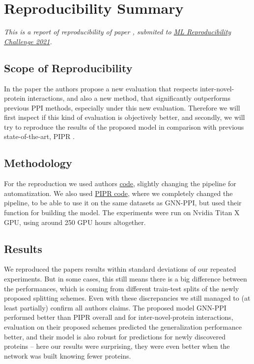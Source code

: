

\section{Reproducibility Summary}

\textit{This is a report of reproducibility of paper \cite{lv2021learning}, submited to  \href{https://paperswithcode.com/rc2021}{ML Reproducibility Challenge 2021}.}

\subsection*{Scope of Reproducibility}

In the paper the authors
propose a new evaluation that respects inter-novel-protein interactions, and also a new method, that significantly outperforms previous PPI methods, especially under this new evaluation. Therefore we will first inspect if this kind of evaluation is objectively better, 
and secondly, we will try to reproduce the results of the proposed model in comparison with previous state-of-the-art, PIPR \cite{chen2019pipr}.

\subsection*{Methodology}

For the reproduction we used authors \href{https://github.com/lvguofeng/GNN_PPI}{code}, slightly changing the pipeline for automatization. We also used \href{https://github.com/muhaochen/seq_ppi}{PIPR code}, where we completely changed the pipeline, to be able to use it on the same datasets as GNN-PPI, but used their function for building the model. 
The experiments were run on Nvidia Titan X GPU, using around 250 GPU hours altogether.

\subsection*{Results}
We reproduced the papers results within standard deviations of our repeated experiments. But in some cases, this still means there is a big difference between the performances, which is coming from different train-test splits of the newly proposed splitting schemes. Even with these discrepancies we still managed to (at least partially) confirm all authors claims. The proposed model GNN-PPI performed better than PIPR overall and for inter-novel-protein interactions, evaluation on their proposed schemes predicted the generalization performance better, and their model is also robust for predictions for newly discovered proteins -- here our results were surprising, they were even better when the network was built knowing fewer proteins.


